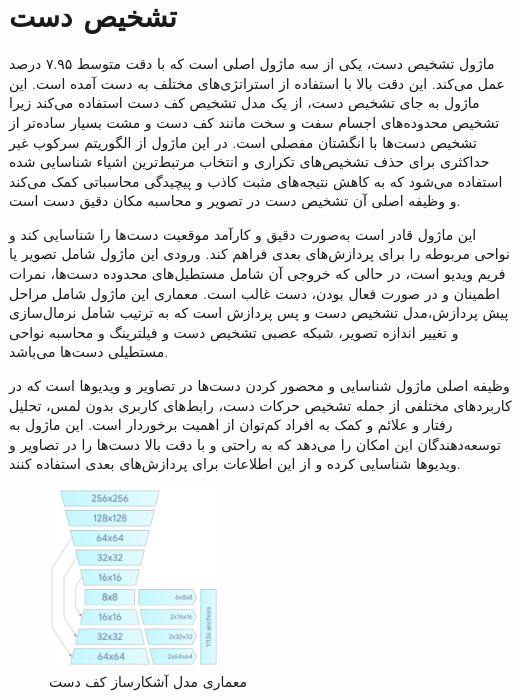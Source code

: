 


\section{تشخیص دست\protect{}}
ماژول تشخیص دست، یکی از سه ماژول اصلی است که با دقت متوسط ۷.۹۵ درصد عمل می‌کند. این دقت بالا با استفاده از استراتژی‌های مختلف به دست آمده است. این ماژول به جای تشخیص دست، 
از یک مدل تشخیص کف دست استفاده می‌کند زیرا تشخیص محدوده‌های اجسام سفت و سخت مانند کف دست و مشت بسیار ساده‌تر از تشخیص دست‌ها با انگشتان مفصلی است. در این ماژول از
 الگوریتم سرکوب غیر حداکثری برای حذف تشخیص‌های تکراری و انتخاب مرتبط‌ترین اشیاء شناسایی شده استفاده می‌شود که به کاهش نتیجه‌های مثبت کاذب و پیچیدگی محاسباتی کمک می‌کند و وظیفه اصلی آن تشخیص دست در تصویر و محاسبه مکان دقیق دست است.

این ماژول قادر است به‌صورت دقیق و کارآمد موقعیت دست‌ها را شناسایی کند و نواحی مربوطه را برای
 پردازش‌های بعدی فراهم کند. ورودی این ماژول شامل تصویر یا فریم ویدیو است، در حالی که خروجی آن شامل مستطیل‌های محدوده دست‌ها، نمرات اطمینان و در صورت فعال بودن، دست غالب است. معماری این ماژول شامل 
 مراحل پیش پردازش،مدل تشخیص دست و پس پردازش است که به ترتیب شامل نرمال‌سازی و تغییر اندازه تصویر، شبکه عصبی تشخیص دست و فیلترینگ و محاسبه نواحی مستطیلی دست‌ها می‌باشد.

وظیفه اصلی ماژول شناسایی و محصور کردن دست‌ها در تصاویر و ویدیوها است که در کاربردهای مختلفی از جمله تشخیص حرکات دست، رابط‌های کاربری بدون لمس، تحلیل رفتار و علائم و کمک به افراد کم‌توان
 از اهمیت برخوردار است. این ماژول به توسعه‌دهندگان این امکان را می‌دهد که به راحتی و با دقت بالا دست‌ها را در تصاویر و ویدیوها شناسایی کرده و از این اطلاعات برای پردازش‌های بعدی استفاده کنند.


\begin{figure}[h]
    \centering
    \includegraphics[width=0.4\textwidth]{hand_detector.png}
    \caption[معماری مدل آشکارساز کف دست]{معماری مدل آشکارساز کف دست\cite{zhang2020mediapipe}}
\end{figure}

